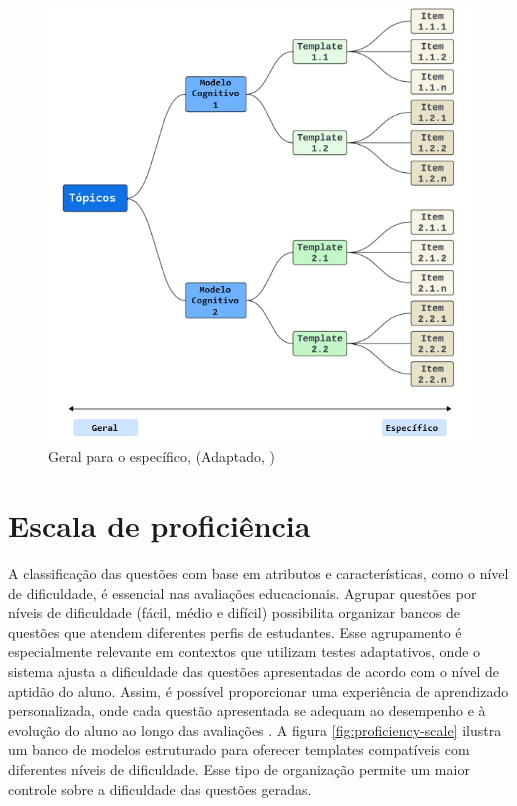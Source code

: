 \begin{figure}[ht]
	\centering
	\includegraphics[width=14cm]{./imagens/capitulo5/geral-especifico-com-topicos}
	\caption{Geral para o específico, (Adaptado, \cite{hendrickson2010}) }
	\label{fig:geral-to-specif}
\end{figure}


\section{Escala de proficiência}

A classificação das questões com base em atributos e características, como o nível de dificuldade, é essencial nas avaliações educacionais. Agrupar questões por níveis de dificuldade (fácil, médio e difícil) possibilita organizar bancos de questões que atendem diferentes perfis de estudantes.  Esse agrupamento é especialmente relevante em contextos que utilizam testes adaptativos, onde o sistema ajusta a dificuldade das questões apresentadas de acordo com o nível de aptidão do aluno. Assim, é possível proporcionar uma experiência de aprendizado personalizada, onde cada questão apresentada se adequam ao desempenho e à evolução do aluno ao longo das avaliações \parencite{pasquali2018}. A figura \ref{fig:proficiency-scale}  ilustra um banco de modelos estruturado para oferecer templates compatíveis com diferentes níveis de dificuldade. Esse tipo de organização permite um maior controle sobre a dificuldade das questões geradas.



